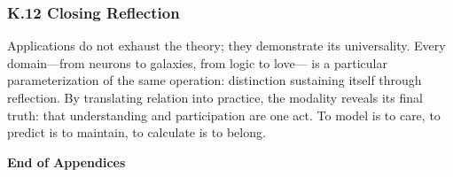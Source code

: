 \documentclass[11pt]{article}
\begin{document}
\subsubsection*{K.12 Closing Reflection}
\label{sec:org3679708}
Applications do not exhaust the theory; they demonstrate its universality.  
Every domain—from neurons to galaxies, from logic to love—  
is a particular parameterization of the same operation:  
distinction sustaining itself through reflection.  
By translating relation into practice,  
the modality reveals its final truth: that understanding and participation are one act.  
To model is to care, to predict is to maintain, to calculate is to belong.

\textbf{End of Appendices}
\end{document}
